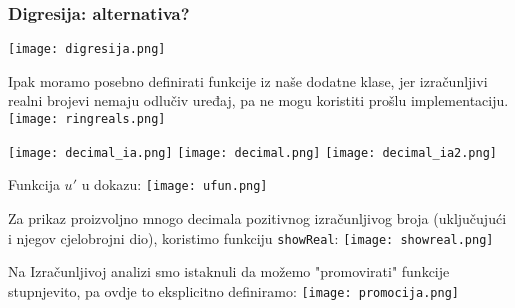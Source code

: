 \documentclass{beamer}
\begin{document}
\begin{frame}
    \frametitle{Digresija: alternativa?}
    \texttt{[image: digresija.png]}
\end{frame}
\begin{frame}
    Ipak moramo posebno definirati funkcije iz naše dodatne klase, jer izračunljivi realni brojevi nemaju odlučiv uređaj, pa ne mogu
    koristiti prošlu implementaciju.
    \texttt{[image: ringreals.png]}
\end{frame}
\begin{frame}
    \texttt{[image: decimal\_ia.png]}
    \texttt{[image: decimal.png]}
    \texttt{[image: decimal\_ia2.png]}
\end{frame}
\begin{frame}
    Funkcija $u'$ u dokazu:
    \texttt{[image: ufun.png]}
\end{frame}
\begin{frame}
    Za prikaz proizvoljno mnogo decimala pozitivnog izračunljivog broja (uključujući i njegov cjelobrojni dio), koristimo funkciju
    \texttt{showReal}:
    \texttt{[image: showreal.png]}
\end{frame}
\begin{frame}
    Na Izračunljivoj analizi smo istaknuli da možemo "promovirati" funkcije stupnjevito, pa ovdje to eksplicitno 
    definiramo:
    \texttt{[image: promocija.png]}
\end{frame}
\end{document}
